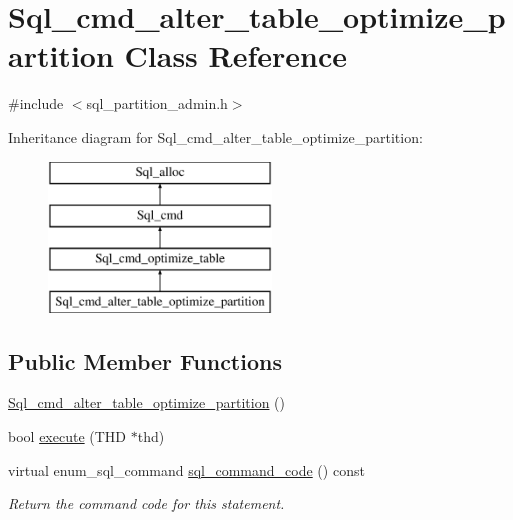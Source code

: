 \hypertarget{classSql__cmd__alter__table__optimize__partition}{}\section{Sql\+\_\+cmd\+\_\+alter\+\_\+table\+\_\+optimize\+\_\+partition Class Reference}
\label{classSql__cmd__alter__table__optimize__partition}


{\ttfamily \#include $<$sql\+\_\+partition\+\_\+admin.\+h$>$}

Inheritance diagram for Sql\+\_\+cmd\+\_\+alter\+\_\+table\+\_\+optimize\+\_\+partition\+:\begin{figure}[H]
\begin{center}
\leavevmode
\includegraphics[height=4.000000cm]{classSql__cmd__alter__table__optimize__partition}
\end{center}
\end{figure}
\subsection*{Public Member Functions}
\begin{DoxyCompactItemize}
\item 
\mbox{\hyperlink{classSql__cmd__alter__table__optimize__partition_aadebe9f58be49c1e3957505f7c160d4b}{Sql\+\_\+cmd\+\_\+alter\+\_\+table\+\_\+optimize\+\_\+partition}} ()
\item 
bool \mbox{\hyperlink{classSql__cmd__alter__table__optimize__partition_a16ec9cb4ba62fbc49842abd1044bdc2a}{execute}} (T\+HD $\ast$thd)
\item 
\mbox{\label{classSql__cmd__alter__table__optimize__partition_a1c7fbc703e770c6dce8eda002fe633b0}} 
virtual enum\+\_\+sql\+\_\+command \mbox{\hyperlink{classSql__cmd__alter__table__optimize__partition_a1c7fbc703e770c6dce8eda002fe633b0}{sql\+\_\+command\+\_\+code}} () const
\begin{DoxyCompactList}\small\item\em Return the command code for this statement. \end{DoxyCompactList}\end{DoxyCompactItemize}
